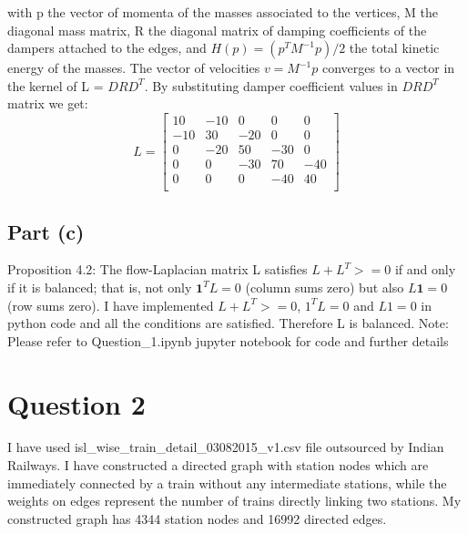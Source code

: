\documentclass[conference]{IEEEtran}
\begin{document}
with p the vector of momenta of the masses associated to the
vertices, M the diagonal mass matrix, R the diagonal matrix of
damping coefficients of the dampers attached to the edges, and
$H(p) = ({p^T}{M^{-1}}p)/2$ the total kinetic energy of the masses. The
vector of velocities $v = {M^{-1}}p$ converges to a vector in the kernel
of L = $DR{D^T}$.
By substituting damper coefficient values in $DR{D^T}$ matrix we get:
\[L = 
\begin{bmatrix}
    10 & -10 & 0 & 0 & 0\\
    -10 & 30 & -20 & 0 & 0\\
    0 & -20 & 50 & -30 & 0\\
    0 & 0 & -30 & 70 & -40\\
    0 & 0 & 0 & -40 & 40\\
\end{bmatrix}
\]

\subsection{Part (c)}
Proposition 4.2: The flow-Laplacian matrix L satisfies $L + {L^T} >= 0$ if and only if it is balanced; that is, not only ${\mathbf{1}^T}L = 0$ (column sums zero) but also $L{\mathbf{1}} = 0$ (row sums zero).
\newline
I have implemented $L + {L^T} >= 0$, ${\mathbf{}{1}^T}L = 0$ and $L{\mathbf{}{1}} = 0$ in python code and all the conditions are satisfied.
Therefore L is balanced.
\newline
\newline
Note: Please refer to Question\_1.ipynb jupyter notebook for code and further details

\section{Question 2}
I have used isl\_wise\_train\_detail\_03082015\_v1.csv file outsourced by Indian Railways. I have constructed a directed graph with station nodes which are immediately connected by a train without any intermediate stations, while the weights on edges represent the number of trains directly linking two stations. My constructed graph has 4344 station nodes and 16992 directed edges.
\end{document}
